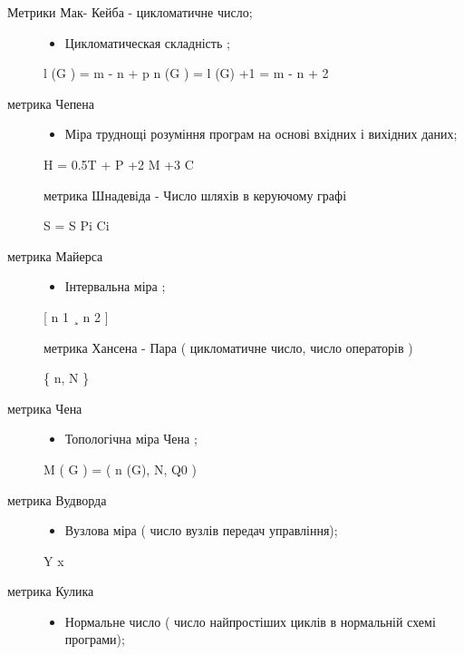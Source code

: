 \begin{description}
\item[{Метрики Мак- Кейба - цикломатичне число;}] \leavevmode\begin{itemize}
\item {} 
Цикломатическая складність ;

\end{itemize}

l (G ) = m - n + p
n (G ) = l (G) +1 = m - n + 2

\item[{метрика Чепена}] \leavevmode\begin{itemize}
\item {} 
Міра труднощі розуміння програм на основі вхідних і вихідних даних;

\end{itemize}

H = 0.5T + P +2 M +3 C

метрика Шнадевіда
- Число шляхів в керуючому графі

S = S Pi Ci

\item[{метрика Майерса}] \leavevmode\begin{itemize}
\item {} 
Інтервальна міра ;

\end{itemize}

{[} n 1 ¸ n 2 {]}

метрика Хансена
- Пара ( цикломатичне число, число операторів )

\{ n, N \}

\item[{метрика Чена}] \leavevmode\begin{itemize}
\item {} 
Топологічна міра Чена ;

\end{itemize}

M ( G ) = ( n (G), N, Q0 )

\item[{метрика Вудворда}] \leavevmode\begin{itemize}
\item {} 
Вузлова міра ( число вузлів передач управління);

\end{itemize}

Y x

\item[{метрика Кулика}] \leavevmode\begin{itemize}
\item {} 
Нормальне число ( число найпростіших циклів в нормальній схемі програми);


\end{itemize}
\end{description}
